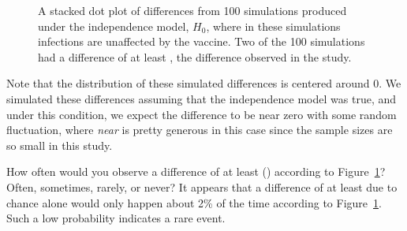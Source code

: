 \begin{figure}[ht]
  \centering
  \caption{A stacked dot plot of differences from
      100 simulations produced under the independence model,
      $H_0$, where in these simulations infections are
      unaffected by the vaccine.
      Two of the 100 simulations had a difference of
      at least \malariaIRDiffPerc{}, the difference observed
      in the study.}
  \label{malaria_rand_dot_plot}
\end{figure}

Note that the distribution of these simulated differences
is centered around 0.
We simulated these differences assuming that the independence
model was true, and under this condition,
we expect the difference to be near zero with some random
fluctuation, where \emph{near} is pretty generous in this
case since the sample sizes are so small in this study.

\begin{examplewrap}
\begin{nexample}{How often would you observe a difference
    of at least \malariaIRDiffPerc{} (\malariaIRDiff{})
    according to Figure~\ref{malaria_rand_dot_plot}?
    Often, sometimes, rarely, or never?}
  It appears that a difference of at least
  \malariaIRDiffPerc{} due to chance alone would only
  happen about 2\% of the time according to
  Figure~\ref{malaria_rand_dot_plot}.
  Such a low probability indicates a rare event.
\end{nexample}
\end{examplewrap}

